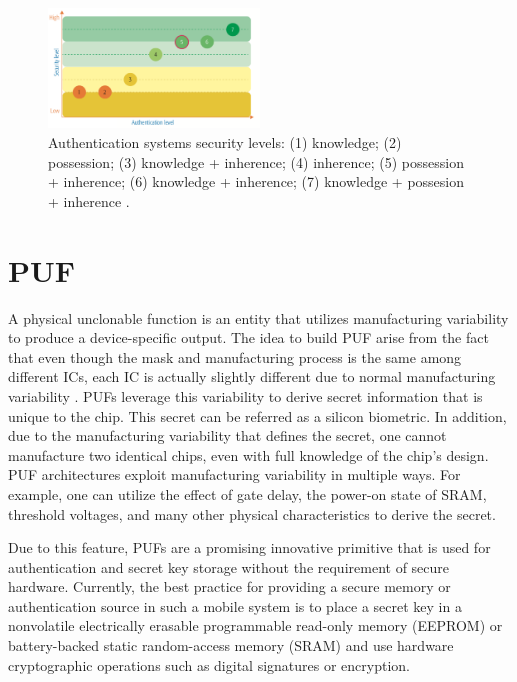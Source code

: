 \begin{figure}[tph!]
    \centerline{\includegraphics[width={0.5\textwidth}]{images/authentication}}
    \caption{Authentication systems security levels: (1) knowledge; (2) possession; (3) knowledge + inherence; (4) inherence; (5) possession + inherence; (6) knowledge + inherence; (7) knowledge + possesion + inherence \cite{Galdi2018ExploringNA}.}
    \label{fig:authentication}
\end{figure}


\section{PUF}
A physical unclonable function is an entity that utilizes manufacturing variability to produce a device-specific output. The idea to build PUF arise from the fact that even though the mask and manufacturing process is the same among different ICs, each IC is actually slightly different due to normal manufacturing variability \cite{retrospective}. PUFs leverage this variability to derive secret information that is unique to the chip. This secret can be referred as a silicon biometric.
In addition, due to the manufacturing variability that defines the secret, one cannot manufacture two identical chips, even with full knowledge of the chip’s design. PUF architectures exploit manufacturing variability in multiple ways. For example, one can utilize the effect of gate delay, the power-on state of SRAM, threshold voltages, and many other physical characteristics to derive the secret.

Due to this feature, PUFs are a promising innovative primitive that is used for authentication and secret key storage without the requirement of secure hardware. Currently, the best practice for providing a secure memory or authentication source in such a mobile system is to place a secret key in a nonvolatile electrically erasable programmable read-only memory (EEPROM) or battery-backed static random-access memory (SRAM) and use hardware cryptographic operations such as digital signatures or encryption.

